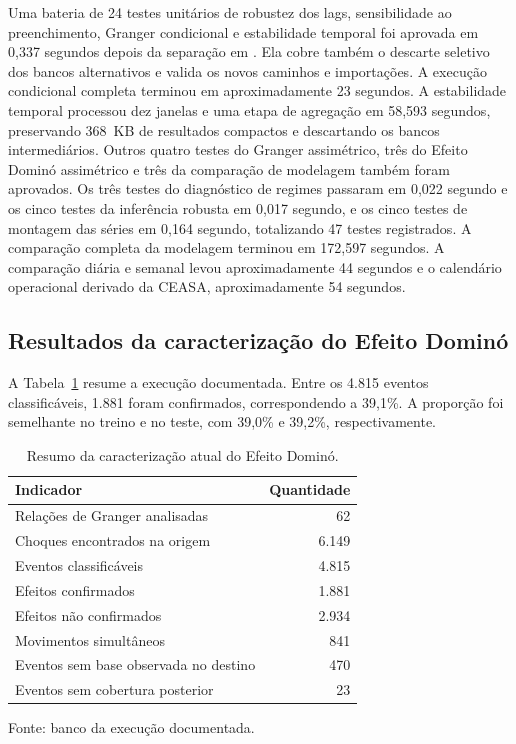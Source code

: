 \documentclass[12pt,a4paper]{article}
\begin{document}
Uma bateria de 24 testes unitários de robustez dos lags, sensibilidade ao
preenchimento, Granger condicional e estabilidade temporal foi aprovada em
0,337 segundos depois da separação em . Ela cobre
também o descarte seletivo dos bancos alternativos e valida os novos caminhos e
importações. A execução condicional completa terminou em aproximadamente 23
segundos. A estabilidade temporal processou dez janelas e uma etapa de
agregação em 58,593 segundos, preservando 368~KB de resultados compactos e
descartando os bancos intermediários. Outros quatro testes do Granger
assimétrico, três do Efeito Dominó assimétrico e três da comparação de modelagem
também foram aprovados. Os três testes do diagnóstico de regimes passaram em
0,022 segundo e os cinco testes da inferência robusta em 0,017 segundo,
e os cinco testes de montagem das séries em 0,164 segundo, totalizando 47
testes registrados. A comparação completa da modelagem terminou em 172,597
segundos. A comparação diária e semanal levou aproximadamente 44 segundos e o
calendário operacional derivado da CEASA, aproximadamente 54 segundos.

\subsection{Resultados da caracterização do Efeito Dominó}

A Tabela~\ref{tab:efeito-domino-resultados} resume a execução documentada.
Entre os 4.815 eventos classificáveis, 1.881 foram confirmados, correspondendo
a 39,1\%. A proporção foi semelhante no treino e no teste, com 39,0\% e 39,2\%,
respectivamente.

\begin{table}[htbp]
    \centering
    \caption{Resumo da caracterização atual do Efeito Dominó.}
    \label{tab:efeito-domino-resultados}
    \small
    \begin{tabular}{lr}
        \toprule
        \textbf{Indicador} & \textbf{Quantidade} \\
        \midrule
        Relações de Granger analisadas & 62 \\
        Choques encontrados na origem & 6.149 \\
        Eventos classificáveis & 4.815 \\
        Efeitos confirmados & 1.881 \\
        Efeitos não confirmados & 2.934 \\
        Movimentos simultâneos & 841 \\
        Eventos sem base observada no destino & 470 \\
        Eventos sem cobertura posterior & 23 \\
        \bottomrule
    \end{tabular}

    \par\smallskip
    \footnotesize
    Fonte: banco
     da execução documentada.
\end{table}
\end{document}
